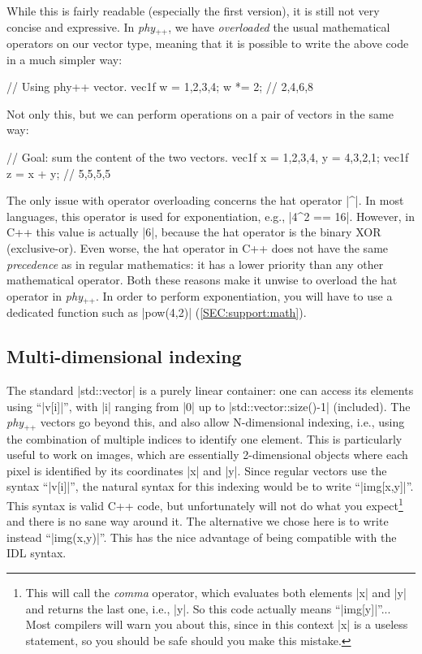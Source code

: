 \documentclass[12pt,a4paper]{report}
\newcommand{\phypp}{\textit{phy}$_{\text{++}}$\xspace}
\newcommand{\stdvec}{\cppinline|std::vector|\xspace}
\newenvironment{warning}
{
    \begin{mdframed}[style=warning,frametitle={Warning}]
}
{
    \end{mdframed}
}
\begin{document}
While this is fairly readable (especially the first version), it is still not very concise and expressive. In \phypp, we have \emph{overloaded} the usual mathematical operators on our vector type, meaning that it is possible to write the above code in a much simpler way:

\begin{cppcode}
// Using phy++ vector.
vec1f w = {1,2,3,4};
w *= 2; // {2,4,6,8}
\end{cppcode}

Not only this, but we can perform operations on a pair of vectors in the same way:
\begin{cppcode}
// Goal: sum the content of the two vectors.
vec1f x = {1,2,3,4}, y = {4,3,2,1};
vec1f z = x + y; // {5,5,5,5}
\end{cppcode}

\begin{warning}
The only issue with operator overloading concerns the hat operator \cppinline|^|. In most languages, this operator is used for exponentiation, e.g., \cppinline|4^2 == 16|. However, in C++ this value is actually \cppinline|6|, because the hat operator is the binary XOR (exclusive-or). Even worse, the hat operator in C++ does not have the same \emph{precedence} as in regular mathematics: it has a lower priority than any other mathematical operator. Both these reasons make it unwise to overload the hat operator in \phypp. In order to perform exponentiation, you will have to use a dedicated function such as \cppinline|pow(4,2)| (\ref{SEC:support:math}).
\end{warning}

\subsection{Multi-dimensional indexing \label{SEC:core:overview:multidim}}

The standard \stdvec is a purely linear container: one can access its elements using ``\cppinline|v[i]|'', with \cppinline|i| ranging from \cppinline|0| up to \cppinline|std::vector::size()-1| (included). The \phypp vectors go beyond this, and also allow \mbox{N-dimensional} indexing, i.e., using the combination of multiple indices to identify one element. This is particularly useful to work on images, which are essentially \mbox{2-dimensional} objects where each pixel is identified by its coordinates \cppinline|x| and \cppinline|y|. Since regular vectors use the syntax ``\cppinline|v[i]|'', the natural syntax for this indexing would be to write ``\cppinline|img[x,y]|''. This syntax is valid C++ code, but unfortunately will not do what you expect\footnote{This will call the \emph{comma} operator, which evaluates both elements \cppinline|x| and \cppinline|y| and returns the last one, i.e., \cppinline|y|. So this code actually means ``\cppinline|img[y]|''... Most compilers will warn you about this, since in this context \cppinline|x| is a useless statement, so you should be safe should you make this mistake.} and there is no sane way around it. The alternative we chose here is to write instead ``\cppinline|img(x,y)|''. This has the nice advantage of being compatible with the IDL syntax.
\end{document}
